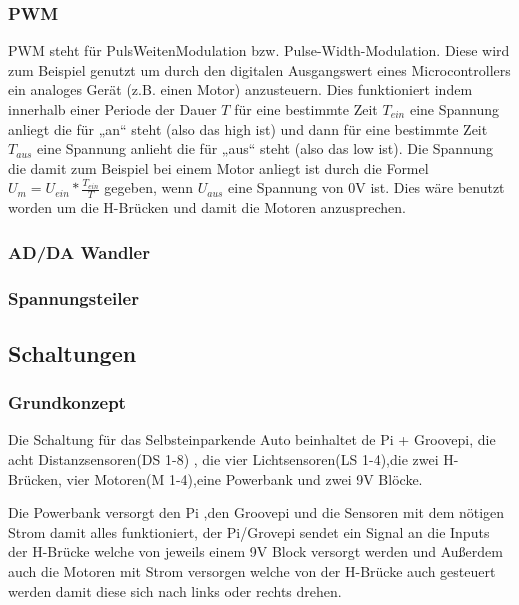 \documentclass[notitlepage]{report}
\begin{document}
\subsubsection{PWM}

PWM steht f\"{u}r PulsWeitenModulation bzw. Pulse-Width-Modulation. Diese wird zum Beispiel genutzt um durch den digitalen Ausgangswert eines Microcontrollers ein analoges Ger\"{a}t (z.B. einen Motor) anzusteuern. Dies funktioniert indem innerhalb einer Periode der Dauer $T$ f\"{u}r eine bestimmte Zeit $T_{ein}$ eine Spannung anliegt die f\"{u}r „an“ steht (also das high ist) und dann f\"{u}r eine bestimmte Zeit $T_{aus}$ eine Spannung anlieht die f\"{u}r „aus“ steht (also das low ist). Die Spannung die damit zum Beispiel bei einem Motor anliegt ist durch die Formel $U_m = U_{ein} * \frac{T_{ein}}{T}$ gegeben, wenn $U_{aus}$ eine Spannung von 0V ist. Dies w\"{a}re benutzt worden um die H-Br\"{u}cken und damit die Motoren anzusprechen.

\subsubsection{AD/DA Wandler}

\subsubsection{Spannungsteiler}

\subsection{Schaltungen}

\subsubsection{Grundkonzept}

Die Schaltung f\"{u}r das Selbsteinparkende Auto beinhaltet de Pi + Groovepi, die acht Distanzsensoren(DS 1-8) , die vier Lichtsensoren(LS 1-4),die zwei H-Br\"{u}cken, vier Motoren(M 1-4),eine Powerbank und zwei 9V Bl\"{o}cke.

Die Powerbank versorgt den Pi ,den Groovepi und die Sensoren mit dem n\"{o}tigen Strom damit alles funktioniert, der Pi/Grovepi sendet ein Signal an die Inputs der H-Br\"{u}cke welche von jeweils einem 9V Block versorgt werden und Au{\ss}erdem auch die Motoren mit Strom versorgen welche von der H-Br\"{u}cke auch gesteuert werden damit diese sich nach links oder rechts drehen.
\end{document}
